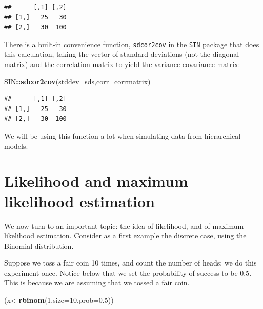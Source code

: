 \documentclass[12pt,]{krantz}
\newenvironment{Shaded}{\begin{snugshade}}{\end{snugshade}}
\newcommand{\DataTypeTok}[1]{\textcolor[rgb]{0.13,0.29,0.53}{#1}}
\newcommand{\DecValTok}[1]{\textcolor[rgb]{0.00,0.00,0.81}{#1}}
\newcommand{\FloatTok}[1]{\textcolor[rgb]{0.00,0.00,0.81}{#1}}
\newcommand{\KeywordTok}[1]{\textcolor[rgb]{0.13,0.29,0.53}{\textbf{#1}}}
\newcommand{\NormalTok}[1]{#1}
\newcommand{\OperatorTok}[1]{\textcolor[rgb]{0.81,0.36,0.00}{\textbf{#1}}}
\begin{document}
\begin{Shaded}
\end{Shaded}

\begin{verbatim}
##      [,1] [,2]
## [1,]   25   30
## [2,]   30  100
\end{verbatim}

There is a built-in convenience function, \texttt{sdcor2cov} in the \texttt{SIN} package that does this calculation, taking the vector of standard deviations (not the diagonal matrix) and the correlation matrix to yield the variance-covariance matrix:

\begin{Shaded}
\begin{Highlighting}[]
\NormalTok{SIN}\OperatorTok{::}\KeywordTok{sdcor2cov}\NormalTok{(}\DataTypeTok{stddev=}\NormalTok{sds,}\DataTypeTok{corr=}\NormalTok{corrmatrix)}
\end{Highlighting}
\end{Shaded}

\begin{verbatim}
##      [,1] [,2]
## [1,]   25   30
## [2,]   30  100
\end{verbatim}

We will be using this function a lot when simulating data from hierarchical models.

\hypertarget{likelihood-and-maximum-likelihood-estimation}{%
\section{Likelihood and maximum likelihood estimation}\label{likelihood-and-maximum-likelihood-estimation}}

We now turn to an important topic: the idea of likelihood, and of maximum likelihood estimation. Consider as a first example the discrete case, using the Binomial distribution.

Suppose we toss a fair coin 10 times, and count the number of heads; we do this experiment once. Notice below that we set the probability of success to be 0.5. This is because we are assuming that we tossed a fair coin.

\begin{Shaded}
\begin{Highlighting}[]
\NormalTok{(x<-}\KeywordTok{rbinom}\NormalTok{(}\DecValTok{1}\NormalTok{,}\DataTypeTok{size=}\DecValTok{10}\NormalTok{,}\DataTypeTok{prob=}\FloatTok{0.5}\NormalTok{))}
\end{Highlighting}
\end{Shaded}
\end{document}
